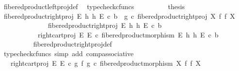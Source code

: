 \begin{isabellebody}
\ fibered{\isacharunderscore}{\kern0pt}product{\isacharunderscore}{\kern0pt}left{\isacharunderscore}{\kern0pt}proj{\isacharunderscore}{\kern0pt}def\ \isamarkupfalse%
\ {\isacharparenleft}{\kern0pt}typecheck{\isacharunderscore}{\kern0pt}cfuncs{\isacharparenright}{\kern0pt}\isanewline
\ \ \ \ \ \ \isamarkupfalse%
\ \isamarkupfalse%
\ {\isacharquery}{\kern0pt}thesis\isacommand{{\isachardot}{\kern0pt}}\isamarkupfalse%
\isanewline
\ \ \ \ \isamarkupfalse%
\isanewline
\ \ \ \ \isamarkupfalse%
\ {\isachardoublequoteopen}fibered{\isacharunderscore}{\kern0pt}product{\isacharunderscore}{\kern0pt}right{\isacharunderscore}{\kern0pt}proj\ E\ h\ h\ E\ {\isasymcirc}\isactrlsub c\ b\ {\isacharequal}{\kern0pt}\ g\ {\isasymcirc}\isactrlsub c\ fibered{\isacharunderscore}{\kern0pt}product{\isacharunderscore}{\kern0pt}right{\isacharunderscore}{\kern0pt}proj\ X\ f\ f\ X{\isachardoublequoteclose}\isanewline
\ \ \ \ \isamarkupfalse%
\ {\isacharminus}{\kern0pt}\isanewline
\ \ \ \ \ \ \isamarkupfalse%
\ {\isachardoublequoteopen}fibered{\isacharunderscore}{\kern0pt}product{\isacharunderscore}{\kern0pt}right{\isacharunderscore}{\kern0pt}proj\ E\ h\ h\ E\ {\isasymcirc}\isactrlsub c\ b\isanewline
\ \ \ \ \ \ \ \ \ \ {\isacharequal}{\kern0pt}\ right{\isacharunderscore}{\kern0pt}cart{\isacharunderscore}{\kern0pt}proj\ E\ E\ {\isasymcirc}\isactrlsub c\ fibered{\isacharunderscore}{\kern0pt}product{\isacharunderscore}{\kern0pt}morphism\ E\ h\ h\ E\ {\isasymcirc}\isactrlsub c\ b{\isachardoublequoteclose}\isanewline
\ \ \ \ \ \ \ \ \isamarkupfalse%
\ fibered{\isacharunderscore}{\kern0pt}product{\isacharunderscore}{\kern0pt}right{\isacharunderscore}{\kern0pt}proj{\isacharunderscore}{\kern0pt}def\ \isamarkupfalse%
\ {\isacharparenleft}{\kern0pt}typecheck{\isacharunderscore}{\kern0pt}cfuncs{\isacharcomma}{\kern0pt}\ simp\ add{\isacharcolon}{\kern0pt}\ comp{\isacharunderscore}{\kern0pt}associative{}{\isacharparenright}{\kern0pt}\isanewline
\ \ \ \ \ \ \isamarkupfalse%
\ \isamarkupfalse%
\ {\isachardoublequoteopen}{\isachardot}{\kern0pt}{\isachardot}{\kern0pt}{\isachardot}{\kern0pt}\ {\isacharequal}{\kern0pt}\ right{\isacharunderscore}{\kern0pt}cart{\isacharunderscore}{\kern0pt}proj\ E\ E\ {\isasymcirc}\isactrlsub c\ {\isacharparenleft}{\kern0pt}g\ {\isasymtimes}\isactrlsub f\ g{\isacharparenright}{\kern0pt}\ {\isasymcirc}\isactrlsub c\ fibered{\isacharunderscore}{\kern0pt}product{\isacharunderscore}{\kern0pt}morphism\ X\ f\ f\ X{\isachardoublequoteclose}\isanewline

\end{isabellebody}
